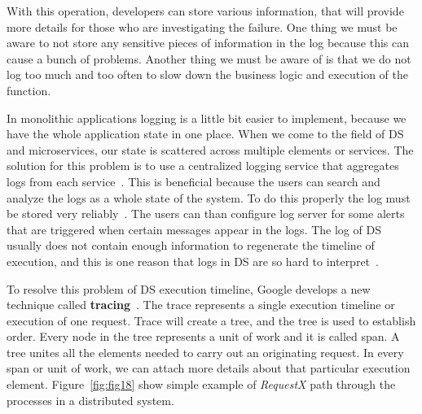 With this operation, developers can store various information, that will provide more details for those who are investigating the failure. One thing we must be aware to not store any sensitive pieces of information in the log because this can cause a bunch of problems. Another thing we must be aware of is that we do not log too much and too often to slow down the business logic and execution of the function.

In monolithic applications logging is a little bit easier to implement, because we have the whole application state in one place. When we come to the field of DS and microservices, our state is scattered across multiple elements or services. The solution for this problem is to use a centralized logging service that aggregates logs from each service~\cite{BeschastnikhWBE16}. This is beneficial because the users can search and analyze the logs as a whole state of the system. To do this properly the log must be stored very reliably~\cite{DanielsST87}. The users can than configure log server for some alerts that are triggered when certain messages appear in the logs. The log of DS usually does not contain enough information to regenerate the timeline of execution, and this is one reason that logs in DS are so hard to interpret~\cite{BeschastnikhWBE16}.

To resolve this problem of DS execution timeline, Google develops a new technique called \textbf{tracing}~\cite{36356}. The trace represents a single execution timeline or execution of one request. Trace will create a tree, and the tree is used to establish order. Every node in the tree represents a unit of work and it is called span. A tree unites all the elements needed to carry out an originating request. In every span or unit of work, we can attach more details about that particular execution element. Figure~\ref{fig:fig18} show simple example of \textit{RequestX} path through the processes in a distributed system.

